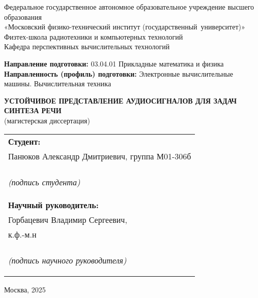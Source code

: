 \begin{center}
    Федеральное государственное автономное образовательное учреждение высшего образования\\
    «Московский физико-технический институт \pt(государственный~университет)»\\

    Физтех-школа радиотехники и компьютерных технологий\\
    Кафедра перспективных вычислительных технологий\\
\end{center}

\noindent
\textbf{Направление подготовки:} 03.04.01 Прикладные математика и физика\\
\textbf{Направленность (профиль) подготовки:} Электронные  вычислительные машины. Вычислительная техника\\

\begin{center}

    \textbf{УСТОЙЧИВОЕ ПРЕДСТАВЛЕНИЕ АУДИОСИГНАЛОВ ДЛЯ ЗАДАЧ СИНТЕЗА РЕЧИ}\\
    (магистерская диссертация)\\[15mm]

\end{center}


\hfill\begin{tabular}{@{}p{.5\linewidth}@{}}

    \textbf{Студент:}\\
    Панюков Александр Дмитриевич, группа М01-306б\\
    \uline{\hfill}\\
    \begin{center}\textit{(подпись студента)}\end{center}\\

    \textbf{Научный руководитель:}\\
    Горбацевич Владимир Сергеевич,\\
    к.ф.-м.н\\
    \uline{\hfill}\\
    \begin{center}\textit{(подпись научного руководителя)}\end{center}\\

\end{tabular}


\vfill

\begin{center}
    Москва, 2025
\end{center}

\thispagestyle{empty}
